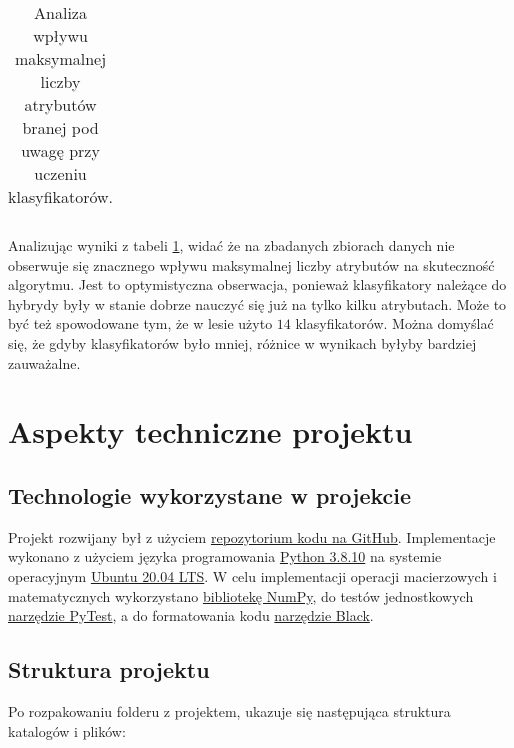 \documentclass[
    left=2.5cm,         %
    right=2.5cm,        %
    top=2.5cm,          %
    bottom=3cm,         %
    bindingoffset=6mm,  %
    nohyphenation=false %
]{eiti/eiti-report}
\begin{document}
\begin{table}[h]
\begin{tabular}{ |p{2cm}||p{3cm}|p{2cm}|p{2cm}|p{2cm}|p{2cm}|  }
\end{tabular}
\caption{Analiza wpływu maksymalnej liczby atrybutów branej pod uwagę przy uczeniu klasyfikatorów.}
\label{tab:attr_table}
\end{table}

Analizując wyniki z tabeli \ref{tab:attr_table}, widać że na zbadanych zbiorach danych nie obserwuje się znacznego wpływu maksymalnej liczby atrybutów na skuteczność algorytmu. Jest to optymistyczna obserwacja, ponieważ klasyfikatory należące do hybrydy były w stanie dobrze nauczyć się już na tylko kilku atrybutach. Może to być też spowodowane tym, że w lesie użyto $14$ klasyfikatorów. Można domyślać się, że gdyby klasyfikatorów było mniej, różnice w wynikach byłyby bardziej zauważalne.


\section{Aspekty techniczne projektu}
\subsection{Technologie wykorzystane w projekcie}
Projekt rozwijany był z użyciem \href{https://github.com/bartooo/random-forest-svm-hybrid}{repozytorium kodu na GitHub}. Implementacje wykonano z użyciem języka programowania \href{https://www.python.org}{Python 3.8.10} na systemie operacyjnym \href{https://ubuntu.com}{Ubuntu 20.04 LTS}. W celu implementacji operacji macierzowych i matematycznych wykorzystano \href{https://numpy.org}{bibliotekę NumPy}, do testów jednostkowych \href{https://docs.pytest.org/en/7.1.x/}{narzędzie PyTest}, a do formatowania kodu \href{https://github.com/psf/black}{narzędzie Black}.
\subsection{Struktura projektu}

Po rozpakowaniu folderu z projektem, ukazuje się następująca struktura katalogów i plików:
\end{document}
